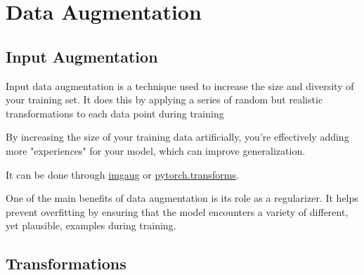 \documentclass[11pt]{article}
\begin{document}


\tableofcontents

\clearpage

\section{Data Augmentation}

\subsection{Input Augmentation}

Input data augmentation is a technique used to increase the size and diversity of your
training set. It does this by applying a series of random but realistic transformations to each data
point during training

By increasing the size of your training data artificially, you're effectively adding more "experiences" for your model, which can improve generalization.

It can be done through \href{https://github.com/aleju/imgaug}{imgaug} or \href{https://pytorch.org/vision/stable/transforms.html}{pytorch.transforms}.

One of the main benefits of data augmentation is its role as a regularizer. It helps prevent overfitting by ensuring that the model encounters a variety of different, yet plausible, examples during training.

\subsection{Transformations}
\end{document}
